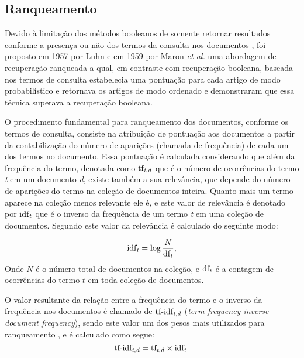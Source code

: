 \subsection{Ranqueamento} \label{subsec:Ranqueamento}
    Devido à limitação dos métodos booleanos de somente retornar resultados conforme a presença ou não dos termos da consulta nos documentos \cite[p.~100]{Manning2008IIR}, foi proposto em 1957 por Luhn e em 1959 por Maron \textit{et al.} uma abordagem de recuperação ranqueada \cite[p.~1446]{Sanderson2012THIRR} a qual, em contraste com recuperação booleana, baseada nos termos de consulta estabelecia uma pontuação para cada artigo de modo probabilístico e retornava os artigos de modo ordenado e demonstraram que essa técnica superava a recuperação booleana.
    
    O procedimento fundamental para ranqueamento dos documentos, conforme os termos de consulta, consiste na atribuição de pontuação aos documentos a partir da contabilização do número de aparições (chamada de frequência) de cada um dos termos no documento.
    Essa pontuação é calculada considerando que além da frequência do termo, denotada como $\text{tf}_{\text{\textit{t},\textit{d}}}$ que é o número de ocorrências do termo \textit{t} em um documento \textit{d}, existe também a sua relevância, que depende do número de aparições do termo na coleção de documentos inteira.
    Quanto mais um termo aparece na coleção menos relevante ele é, e este valor de relevância é denotado por $\text{idf}_{\text{\textit{t}}}$ que é o inverso da frequência de um termo \textit{t} em uma coleção de documentos.
    Segundo  este valor da relevância é calculado do seguinte modo:

    \begin{equation}
        \label{eq:inverse-document-frequency}
        \text{idf}_{\text{\textit{t}}} = \log{\frac{N}{\text{df}_{\text{\textit{t}}}}},
    \end{equation}
    Onde $N$ é o número total de documentos na coleção, e $\text{df}_{\text{\textit{t}}}$ é a contagem de ocorrências do termo $t$ em toda coleção de documentos.
    
    O valor resultante da relação entre a frequência do termo e o inverso da frequência nos documentos é chamado de $\text{tf-idf}_{\text{\textit{t},\textit{d}}}$ (\textit{term frequency-inverse document frequency}), sendo este valor um dos pesos mais utilizados para ranqueamento \cite[p.~107--110]{Manning2008IIR}, e é calculado  como segue:
    \begin{equation}
        \label{eq:tf-idf}
        \text{tf-idf}_{\text{\textit{t},\textit{d}}}  = \text{tf}_{\text{\textit{t},\textit{d}}} \times \text{idf}_{\text{\textit{t}}}.
    \end{equation}
    
